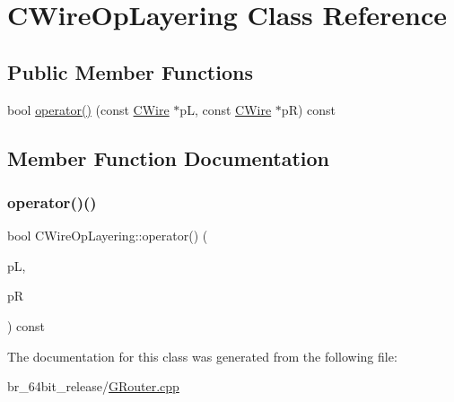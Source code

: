 \hypertarget{classCWireOpLayering}{}\section{C\+Wire\+Op\+Layering Class Reference}
\label{classCWireOpLayering}
\subsection*{Public Member Functions}
\begin{DoxyCompactItemize}
\item 
bool \mbox{\hyperlink{classCWireOpLayering_a57cfdbdbcf1bc914c49ec04698e0ba63}{operator()}} (const \mbox{\hyperlink{classCWire}{C\+Wire}} $\ast$pL, const \mbox{\hyperlink{classCWire}{C\+Wire}} $\ast$pR) const
\end{DoxyCompactItemize}


\subsection{Member Function Documentation}
\mbox{\label{classCWireOpLayering_a57cfdbdbcf1bc914c49ec04698e0ba63}} 
\subsubsection{\texorpdfstring{operator()()}{operator()()}}
{\footnotesize\ttfamily bool C\+Wire\+Op\+Layering\+::operator() (\begin{DoxyParamCaption}\item[{const \mbox{\hyperlink{classCWire}{C\+Wire}} $\ast$}]{pL,  }\item[{const \mbox{\hyperlink{classCWire}{C\+Wire}} $\ast$}]{pR }\end{DoxyParamCaption}) const\hspace{0.3cm}{\ttfamily [inline]}}



The documentation for this class was generated from the following file\+:\begin{DoxyCompactItemize}
\item 
br\+\_\+64bit\+\_\+release/\mbox{\hyperlink{GRouter_8cpp}{G\+Router.\+cpp}}\end{DoxyCompactItemize}
